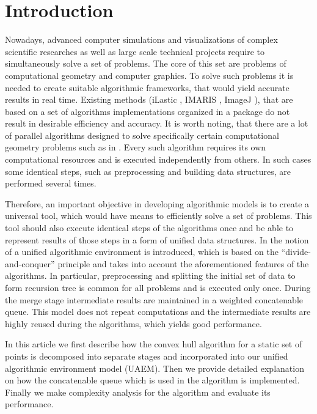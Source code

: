 \documentclass[conference]{IEEEtran}
\begin{document}

\section{Introduction}
\label{sec:introduction}
	
	Nowadays, advanced computer simulations and visualizations of complex scientific researches as well as large scale technical projects require to simultaneously solve a set of problems. The core of this set are problems of computational geometry and computer graphics. To solve such problems it is needed to create suitable algorithmic frameworks, that would yield accurate results in real time. Existing methods (iLastic \cite{ilastik}, IMARIS \cite{imaris}, ImageJ \cite{imagej}), that are based on a set of algorithms implementations organized in a package do not result in desirable efficiency and accuracy. It is worth noting, that there are a lot of parallel algorithms designed to solve specifically certain computational geometry problems such as in \cite{aggarwal,atallah,cole,amato,chen,berkman,goodman,akl,jaja,leeuwen,reif}. Every such algorithm requires its own computational resources and is executed independently from others. In such cases some identical steps, such as preprocessing and building data structures, are performed several times. 
	
	Therefore, an important objective in developing algorithmic models is to create a universal tool, which would have means to efficiently solve a set of problems. This tool should also execute identical steps of the algorithms once and be able to represent results of those steps in a form of unified data structures. In \cite{tereshchenko} the notion of a unified algorithmic environment is introduced, which is based on the ``divide-and-conquer'' principle and takes into account the aforementioned features of the algorithms. In particular, preprocessing and splitting the initial set of data to form recursion tree is common for all problems and is executed only once. During the merge stage intermediate results are maintained in a weighted concatenable queue. This model does not repeat computations and the intermediate results are highly reused during the algorithms, which yields good performance.
	
	In this article we first describe how the convex hull algorithm for a static set of points is decomposed into separate stages and incorporated into our unified algorithmic environment model (UAEM). Then we provide detailed explanation on how the concatenable queue which is used in the algorithm is implemented. Finally we make complexity analysis for the algorithm and evaluate its performance.
\end{document}
